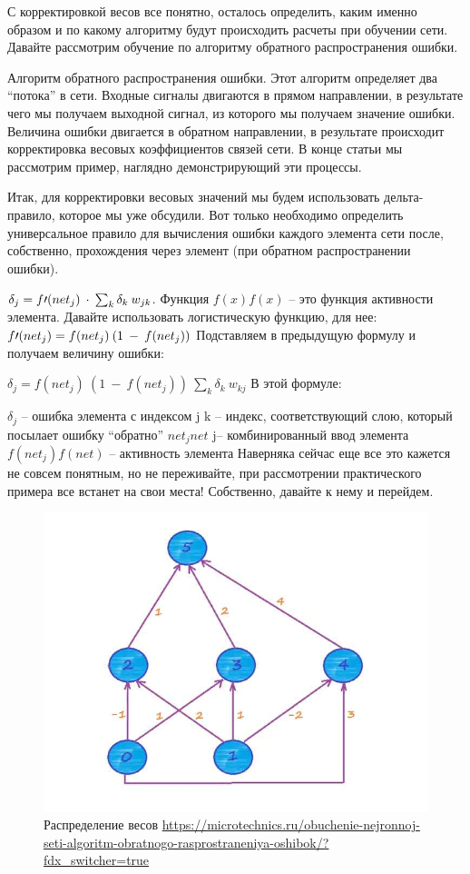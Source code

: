 \documentclass[12pt,a4paper]{report}
\begin{document}
С корректировкой весов все понятно, осталось определить, каким именно образом и по какому алгоритму будут происходить расчеты при обучении сети. Давайте рассмотрим обучение по алгоритму обратного распространения ошибки.

Алгоритм обратного распространения ошибки.
Этот алгоритм определяет два “потока” в сети. Входные сигналы двигаются в прямом направлении, в результате чего мы получаем выходной сигнал, из которого мы получаем значение ошибки. Величина ошибки двигается в обратном направлении, в результате происходит корректировка весовых коэффициентов связей сети. В конце статьи мы рассмотрим пример, наглядно демонстрирующий эти процессы.

Итак, для корректировки весовых значений мы будем использовать дельта-правило, которое мы уже обсудили. Вот только необходимо определить универсальное правило для вычисления ошибки каждого элемента сети после, собственно, прохождения через элемент (при обратном распространении ошибки).

$\delta_j = f{\Large{\prime}}(net_j)\medspace\cdot\medspace \sum_{k}{}{\delta_k\medspace w_{jk}}$. Функция $f(x)f(x)$ – это функция активности элемента. Давайте использовать логистическую функцию, для нее:
$f{\Large{\prime}}(net_j) = f(net_j)\medspace (1\medspace-\medspace f(net_j))$
Подставляем в предыдущую формулу и получаем величину ошибки:

$\delta_j = f(net_j)\medspace (1\medspace-\medspace f(net_j))\medspace \sum_{k}{}{\delta_k\medspace w_{kj}}$
В этой формуле:

$\delta_j$ – ошибка элемента с индексом j
k – индекс, соответствующий слою, который посылает ошибку “обратно”
$net_jnet$ 
j– комбинированный ввод элемента
$f(net_j)f(net)$ – активность элемента
Наверняка сейчас еще все это кажется не совсем понятным, но не переживайте, при рассмотрении практического примера все встанет на свои места! Собственно, давайте к нему и перейдем.

\begin{figure}
	\centering
	\includegraphics[width=\columnwidth]{weight}
	\caption{Распределение весов
	\url{https://microtechnics.ru/obuchenie-nejronnoj-seti-algoritm-obratnogo-rasprostraneniya-oshibok/?fdx_switcher=true}}
	\end{figure}
\end{document}
